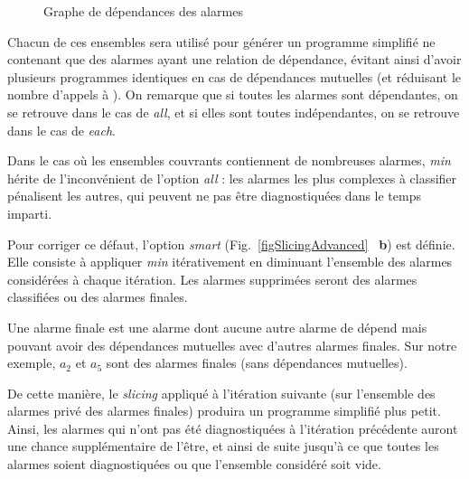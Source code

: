 \begin{figure}
  \centering
  \caption{Graphe de dépendances des alarmes}
  \label{fig:deps}
\end{figure}


Chacun de ces ensembles sera utilisé pour générer un programme simplifié ne
contenant que des alarmes ayant une relation de dépendance, évitant ainsi
d'avoir plusieurs programmes identiques en cas de dépendances mutuelles (et
réduisant le nombre d'appels à \pathcrawler).
On remarque que si toutes les alarmes sont dépendantes, on se retrouve dans le
cas de {\em all}, et si elles sont toutes indépendantes, on se retrouve dans le
cas de {\em each}.

Dans le cas où les ensembles couvrants contiennent de nombreuses alarmes,
{\em min} hérite de l'inconvénient de l'option {\em all} : les alarmes les plus
complexes à classifier pénalisent les autres, qui peuvent ne pas être
diagnostiquées dans le temps imparti.

Pour corriger ce défaut, l'option {\em smart} (Fig.~\ref{figSlicingAdvanced}
~\textbf{b}) est définie. Elle consiste à appliquer {\em min} itérativement en
diminuant l'ensemble des alarmes considérées à chaque itération. Les alarmes
supprimées seront des alarmes classifiées ou des alarmes finales.

\begin{definition}
Une alarme finale est une alarme dont aucune autre alarme de dépend mais
pouvant avoir des dépendances mutuelles avec d'autres alarmes finales.
Sur notre exemple, $a_2$ et $a_5$ sont des alarmes finales (sans dépendances
mutuelles).
\end{definition}

De cette manière, le {\em slicing} appliqué à l'itération suivante (sur
l'ensemble des alarmes privé des alarmes finales) produira un programme
simplifié plus petit. Ainsi, les alarmes qui n'ont pas été diagnostiquées à
l'itération précédente auront une chance supplémentaire de l'être, et ainsi de
suite jusqu'à ce que toutes les alarmes soient diagnostiquées ou que l'ensemble
considéré soit vide.

